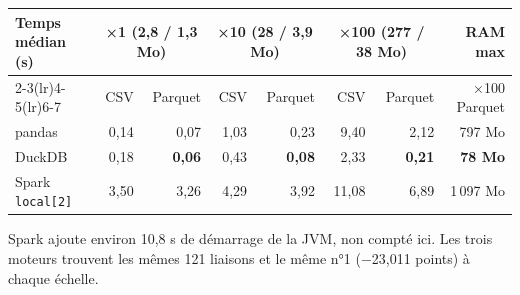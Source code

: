 \documentclass[10pt,a4paper]{article}
\newcommand{\code}[1]{\texttt{\small #1}}
\begin{document}
{\footnotesize
\begin{tabular*}{\linewidth}{@{\extracolsep{\fill}}l *{6}{r} r@{}}
\toprule
Temps médian (s) & \multicolumn{2}{c}{×1 (2,8 / 1,3 Mo)} & \multicolumn{2}{c}{×10 (28 / 3,9 Mo)} & \multicolumn{2}{c}{×100 (277 / 38 Mo)} & RAM max \\
\cmidrule(lr){2-3}\cmidrule(lr){4-5}\cmidrule(lr){6-7}
 & CSV & Parquet & CSV & Parquet & CSV & Parquet & ×100 Parquet \\
\midrule
pandas & 0,14 & 0,07 & 1,03 & 0,23 & 9,40 & 2,12 & 797 Mo \\
DuckDB & 0,18 & \textbf{0,06} & 0,43 & \textbf{0,08} & 2,33 & \textbf{0,21} & \textbf{78 Mo} \\
Spark \code{local[2]} & 3,50 & 3,26 & 4,29 & 3,92 & 11,08 & 6,89 & 1\,097 Mo \\
\bottomrule
\end{tabular*}}
{\footnotesize Spark ajoute environ 10,8 s de démarrage de la JVM, non compté ici. Les trois moteurs trouvent les mêmes 121 liaisons et le même n°1 (−23,011 points) à chaque échelle.\par}
\end{document}
